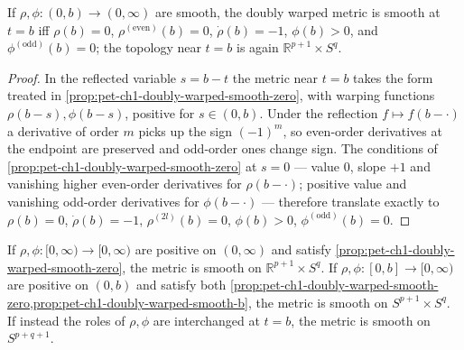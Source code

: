 \begin{proposition}[Proposition 1.4.8 — smoothness at $t=b$]
  \label{prop:pet-ch1-doubly-warped-smooth-b}
  \leanok
  If $\rho,\phi:(0,b)\to(0,\infty)$ are smooth, the doubly warped
  metric is smooth at $t=b$ iff $\rho(b)=0$, $\rho^{(\mathrm{even})}(b)=0$,
  $\dot\rho(b)=-1$, $\phi(b)>0$, and $\phi^{(\mathrm{odd})}(b)=0$; the
  topology near $t=b$ is again $\mathbb{R}^{p+1}\times S^q$.
\end{proposition}
\begin{proof}
  \leanok
  In the reflected variable $s=b-t$ the metric near $t=b$ takes the form
  treated in \cref{prop:pet-ch1-doubly-warped-smooth-zero}, with warping
  functions $\rho(b-s),\phi(b-s)$, positive for $s\in(0,b)$. Under the
  reflection $f\mapsto f(b-\cdot)$ a derivative of order $m$ picks up the
  sign $(-1)^m$, so even-order derivatives at the endpoint are preserved and
  odd-order ones change sign. The conditions of
  \cref{prop:pet-ch1-doubly-warped-smooth-zero} at $s=0$ --- value $0$,
  slope $+1$ and vanishing higher even-order derivatives for $\rho(b-\cdot)$;
  positive value and vanishing odd-order derivatives for $\phi(b-\cdot)$ ---
  therefore translate exactly to $\rho(b)=0$, $\dot\rho(b)=-1$,
  $\rho^{(2l)}(b)=0$, $\phi(b)>0$, $\phi^{(\mathrm{odd})}(b)=0$.
\end{proof}

\begin{remark}
  \label{rem:pet-ch1-doubly-warped-topologies}
  \leanok
  If $\rho,\phi:[0,\infty)\to[0,\infty)$ are positive on $(0,\infty)$ and satisfy
  \cref{prop:pet-ch1-doubly-warped-smooth-zero}, the metric is smooth on
  $\mathbb{R}^{p+1}\times S^q$. If $\rho,\phi:[0,b]\to[0,\infty)$ are positive on $(0,b)$
  and satisfy both \cref{prop:pet-ch1-doubly-warped-smooth-zero,prop:pet-ch1-doubly-warped-smooth-b},
  the metric is smooth on $S^{p+1}\times S^q$. If instead the roles of $\rho,\phi$
  are interchanged at $t=b$, the metric is smooth on $S^{p+q+1}$.
\end{remark}

